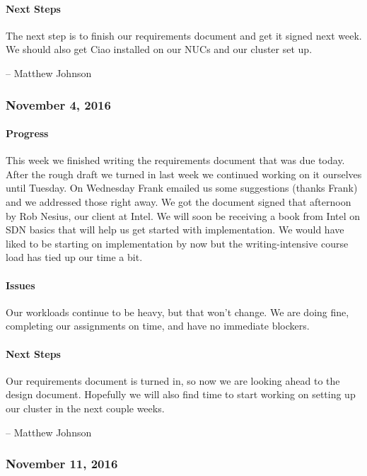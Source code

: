 \documentclass[10pt,onecolumn,journal,draftclsnofoot]{IEEEtran}
\begin{document}
\paragraph{Next Steps} 

The next step is to finish our requirements document and get it signed
next week. We should also get Ciao installed on our NUCs and our cluster
set up.

-- Matthew Johnson

\subsubsection{November 4, 2016} 

\paragraph{Progress} 

This week we finished writing the requirements document that was due
today. After the rough draft we turned in last week we continued working
on it ourselves until Tuesday. On Wednesday Frank emailed us some
suggestions (thanks Frank) and we addressed those right away. We got the
document signed that afternoon by Rob Nesius, our client at Intel. We
will soon be receiving a book from Intel on SDN basics that will help us
get started with implementation. We would have liked to be starting on
implementation by now but the writing-intensive course load has tied up
our time a bit.

\paragraph{Issues} 

Our workloads continue to be heavy, but that won't change. We are doing
fine, completing our assignments on time, and have no immediate
blockers.

\paragraph{Next Steps} 

Our requirements document is turned in, so now we are looking ahead to
the design document. Hopefully we will also find time to start working
on setting up our cluster in the next couple weeks.

-- Matthew Johnson

\subsubsection{November 11, 2016} 
\end{document}
